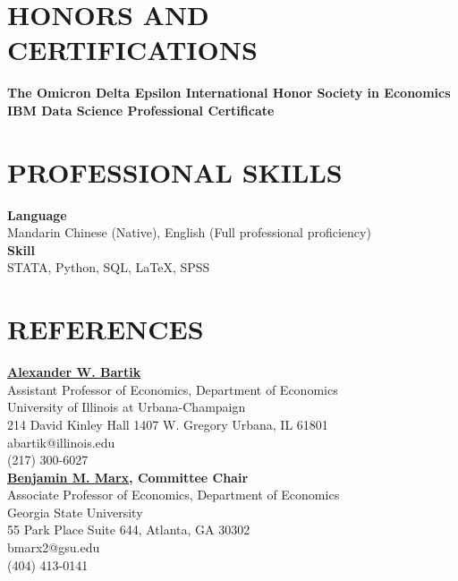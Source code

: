 \documentclass[a4paper,9pt]{extarticle}
\begin{document}

\section*{HONORS AND CERTIFICATIONS}

\noindent
\newline
\textbf{The Omicron Delta Epsilon International Honor Society in Economics} \\

\noindent
\textbf{IBM Data Science Professional Certificate} \\

\section*{PROFESSIONAL SKILLS}

\noindent
\newline
\textbf{Language} \\
Mandarin Chinese (Native), English (Full professional proficiency) \\

\noindent
\textbf{Skill} \\
STATA, Python, SQL, \LaTeX, SPSS \\


\section*{REFERENCES}

\noindent
\textbf{\href{https://www.alexbartik.com}{Alexander W. Bartik}} \\
Assistant Professor of Economics, Department of Economics \\
University of Illinois at Urbana-Champaign \\
214 David Kinley Hall
1407 W. Gregory
Urbana, IL  61801\\
abartik@illinois.edu \\
(217) 300-6027 \\

\noindent
\newline
\textbf{\href{https://sites.google.com/site/benjaminmmarx/}{Benjamin M. Marx}, Committee Chair} \\
Associate Professor of Economics, Department of Economics \\
Georgia State University \\
55 Park Place Suite 644,
Atlanta, GA 30302\\
bmarx2@gsu.edu \\
(404) 413-0141 \\
\end{document}
